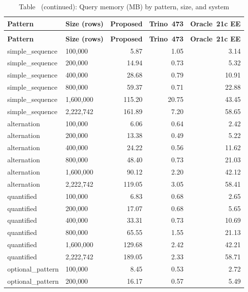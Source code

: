 {\scriptsize
\setlength{\tabcolsep}{3pt}
\begin{longtable}{>{\ttfamily}llrrr}
\caption{Incremental query memory by pattern, size, and system (MB)}
\label{tab:memory_cache} \\
\toprule
\textbf{Pattern} & \textbf{Size (rows)} & \textbf{Proposed} & \textbf{Trino~473} & \textbf{Oracle~21c EE} \\
\midrule
\endfirsthead
\caption*{Table~\thetable{} (continued): Query memory (MB) by pattern, size, and system} \\
\toprule
\textbf{Pattern} & \textbf{Size (rows)} & \textbf{Proposed} & \textbf{Trino~473} & \textbf{Oracle~21c EE} \\
\midrule
\endhead
\bottomrule
\endfoot
simple\_sequence & 100{,}000 & 5.87 & 1.05 & 3.14 \\
simple\_sequence & 200{,}000 & 14.94 & 0.73 & 5.32 \\
simple\_sequence & 400{,}000 & 28.68 & 0.79 & 10.91 \\
simple\_sequence & 800{,}000 & 59.37 & 0.71 & 22.88 \\
simple\_sequence & 1{,}600{,}000 & 115.20 & 20.75 & 43.45 \\
simple\_sequence & 2{,}222{,}742 & 161.89 & 7.20 & 58.65 \\
\midrule
alternation & 100{,}000 & 6.06 & 0.64 & 2.42 \\
alternation & 200{,}000 & 13.38 & 0.49 & 5.22 \\
alternation & 400{,}000 & 24.22 & 0.56 & 11.62 \\
alternation & 800{,}000 & 48.40 & 0.73 & 21.03 \\
alternation & 1{,}600{,}000 & 90.12 & 2.20 & 42.12 \\
alternation & 2{,}222{,}742 & 119.05 & 3.05 & 58.41 \\
\midrule
quantified & 100{,}000 & 6.83 & 0.68 & 2.65 \\
quantified & 200{,}000 & 17.07 & 0.68 & 5.65 \\
quantified & 400{,}000 & 33.31 & 0.73 & 10.69 \\
quantified & 800{,}000 & 65.55 & 1.55 & 21.13 \\
quantified & 1{,}600{,}000 & 129.68 & 2.42 & 42.21 \\
quantified & 2{,}222{,}742 & 189.05 & 2.33 & 58.71 \\
\midrule
optional\_pattern & 100{,}000 & 8.45 & 0.53 & 2.72 \\
optional\_pattern & 200{,}000 & 16.17 & 0.57 & 5.49 \\

\end{longtable}}
